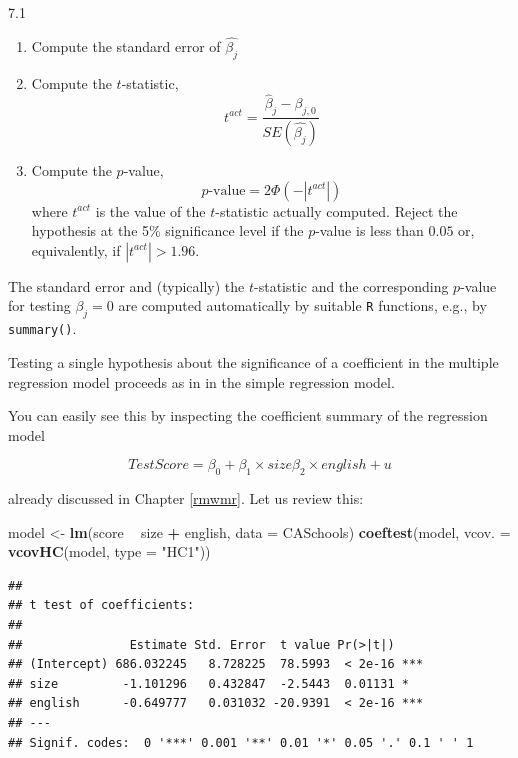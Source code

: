 \documentclass[]{book}
\newenvironment{Shaded}{\begin{snugshade}}{\end{snugshade}}
\newcommand{\KeywordTok}[1]{\textcolor[rgb]{0.13,0.29,0.53}{\textbf{#1}}}
\newcommand{\DataTypeTok}[1]{\textcolor[rgb]{0.13,0.29,0.53}{#1}}
\newcommand{\StringTok}[1]{\textcolor[rgb]{0.31,0.60,0.02}{#1}}
\newcommand{\OperatorTok}[1]{\textcolor[rgb]{0.81,0.36,0.00}{\textbf{#1}}}
\newcommand{\NormalTok}[1]{#1}
\theoremstyle{definition}
\theoremstyle{definition}
\theoremstyle{definition}
\theoremstyle{remark}
\begin{document}
\begin{keyconcepts}[Testing the Hypothesis $\beta_j = \beta_{j,0}$
                    Against the Alternative $\beta_j \neq \beta_{j,0}$]{7.1}
\begin{enumerate}
\item Compute the standard error of $\hat{\beta_j}$
\item Compute the $t$-statistic,
$$t^{act} = \frac{\hat{\beta}_j - \beta_{j,0}} {SE(\hat{\beta_j})}$$
\item Compute the $p$-value,
$$p\text{-value} = 2 \Phi(-|t^{act}|)$$
where $t^{act}$ is the value of the $t$-statistic actually computed. Reject the hypothesis at the 5\% significance level if the $p$-value is less than $0.05$ or, equivalently, if $|t^{act}| > 1.96$. \end{enumerate}\vspace{0.5cm}

The standard error and (typically) the $t$-statistic and the corresponding $p$-value for testing $\beta_j = 0$ are computed automatically by suitable \texttt{R} functions, e.g., by \texttt{summary()}.
\end{keyconcepts}

Testing a single hypothesis about the significance of a coefficient in
the multiple regression model proceeds as in in the simple regression
model.

You can easily see this by inspecting the coefficient summary of the
regression model

\[ TestScore = \beta_0 + \beta_1 \times size  \beta_2 \times english + u \]

already discussed in Chapter \ref{rmwmr}. Let us review this:

\begin{Shaded}
\begin{Highlighting}[]
\NormalTok{model <-}\StringTok{ }\KeywordTok{lm}\NormalTok{(score }\OperatorTok{~}\StringTok{ }\NormalTok{size }\OperatorTok{+}\StringTok{ }\NormalTok{english, }\DataTypeTok{data =}\NormalTok{ CASchools)}
\KeywordTok{coeftest}\NormalTok{(model, }\DataTypeTok{vcov. =} \KeywordTok{vcovHC}\NormalTok{(model, }\DataTypeTok{type =} \StringTok{"HC1"}\NormalTok{))}
\end{Highlighting}
\end{Shaded}

\begin{verbatim}
## 
## t test of coefficients:
## 
##               Estimate Std. Error  t value Pr(>|t|)    
## (Intercept) 686.032245   8.728225  78.5993  < 2e-16 ***
## size         -1.101296   0.432847  -2.5443  0.01131 *  
## english      -0.649777   0.031032 -20.9391  < 2e-16 ***
## ---
## Signif. codes:  0 '***' 0.001 '**' 0.01 '*' 0.05 '.' 0.1 ' ' 1
\end{verbatim}
\end{document}
